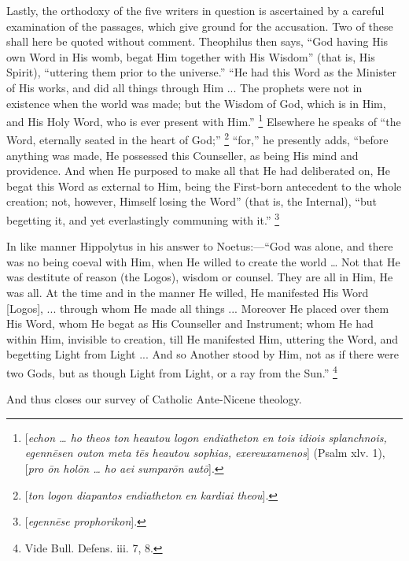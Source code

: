 Lastly, the orthodoxy of the five writers in question is
ascertained by a careful examination of the passages, which give
ground for the accusation. Two of these shall here be quoted without
comment. Theophilus then says, ``God having His own Word in His
womb, begat Him together with His Wisdom'' (that is, His Spirit),
``uttering them prior to the universe.'' ``He had this
Word as the Minister of His works, and did all things through Him ...
The prophets were not in existence when the world was made; but the
Wisdom of God, which is in Him, and His Holy Word, who is ever
present with Him.'' \footnote{[\emph{echon … ho theos ton heautou logon
endiatheton en tois idiois splanchnois, egenn\={e}sen outon meta t\={e}s
heautou sophias, exereuxamenos}] (Psalm xlv. 1), [\emph{pro \={o}n
hol\={o}n … ho aei sumpar\={o}n aut\={o}}].}
Elsewhere he speaks of ``the Word, eternally seated in the heart
of God;'' \footnote{[\emph{ton logon diapantos endiatheton en
kardiai theou}].}
``for,'' he presently adds, ``before anything was made, He
possessed this Counseller, as being His mind and providence. And when
He purposed to make all that He had deliberated on, He begat this Word
as external to Him, being the First-born antecedent to the whole
creation; not, however, Himself losing the Word'' (that is, the
Internal), ``but begetting it, and yet everlastingly communing
with it.'' \footnote{[\emph{egenn\={e}se prophorikon}].}

In like manner Hippolytus in his answer to Noetus:—``God was
alone, and there was no being coeval with Him, when He willed to
create the world … Not that He was destitute of reason (the Logos),
wisdom or counsel. They are all in Him, He was all. At the time and in
the manner He willed, He manifested His Word [Logos], ... through whom
He made all things ... Moreover He placed over them His Word, whom He
begat as His Counseller and Instrument; whom He had within Him,
invisible to creation, till He manifested Him, uttering the Word, and
begetting Light from Light ... And so Another stood by Him, not as if
there were two Gods, but as though Light from Light, or a ray from the
Sun.'' \footnote{Vide Bull. Defens. iii. 7, 8.}

And thus closes our survey of Catholic Ante-Nicene theology.


